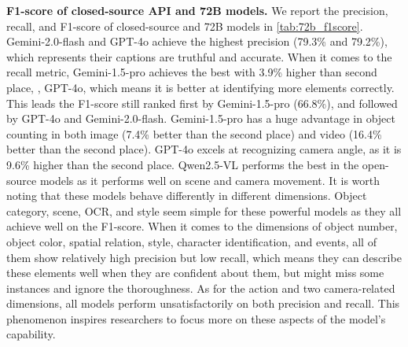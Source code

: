 \noindent\textbf{F1-score of closed-source API and 72B models.}
We report the precision, recall, and F1-score of closed-source and 72B models in \cref{tab:72b_f1score}. Gemini-2.0-flash and GPT-4o achieve the highest precision (79.3\% and 79.2\%), which represents their captions are truthful and accurate. When it comes to the recall metric, Gemini-1.5-pro achieves the best with 3.9\% higher than second place, \ie, GPT-4o, which means it is better at identifying more elements correctly. This leads the F1-score still ranked first by Gemini-1.5-pro (66.8\%), and followed by GPT-4o and Gemini-2.0-flash. Gemini-1.5-pro has a huge advantage in object counting in both image (7.4\% better than the second place) and video (16.4\% better than the second place). GPT-4o excels at recognizing camera angle, as it is 9.6\% higher than the second place. Qwen2.5-VL performs the best in the open-source models as it performs well on scene and camera movement. It is worth noting that these models behave differently in different dimensions. Object category, scene, OCR, and style seem simple for these powerful models as they all achieve well on the F1-score. When it comes to the dimensions of object number, object color, spatial relation, style, character identification, and events, all of them show relatively high precision but low recall, which means they can describe these elements well when they are confident about them, but might miss some instances and ignore the thoroughness. As for the action and two camera-related dimensions, all models perform unsatisfactorily on both precision and recall.
This phenomenon inspires researchers to focus more on these aspects of the model's capability.


